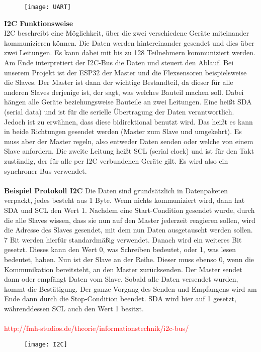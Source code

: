 \documentclass[titlepage,12pt,twoside]{article}
\begin{document}
\begin{figure}[H]
	\begin{center}
		\scalebox{1.0}
		{\texttt{[image: UART]}}
	\end{center}
\end{figure}
\hfill \break
\textbf{I2C Funktionsweise}
\\
I2C beschreibt eine Möglichkeit, über die zwei verschiedene Geräte miteinander 
kommunizieren können. Die Daten werden hintereinander gesendet und dies über zwei 
Leitungen. Es kann dabei mit bis zu 128 Teilnehmern kommuniziert werden. Am Ende 
interpretiert der I2C-Bus die Daten und steuert den Ablauf. Bei unserem Projekt ist 
der ESP32 der Master und die Flexsensoren beispielsweise die Slaves. Der Master ist 
dann der wichtige Bestandteil, da dieser für alle anderen Slaves derjenige ist, der 
sagt, was welches Bauteil machen soll. Dabei hängen alle Geräte beziehungsweise 
Bauteile an zwei Leitungen. Eine heißt SDA (serial data) und ist für die serielle 
Übertragung der Daten verantwortlich. Jedoch ist zu erwähnen, dass diese bidirektional 
benutzt wird. Das heißt es kann in beide Richtungen gesendet werden (Master zum 
Slave und umgekehrt). Es muss aber der Master regeln, also entweder Daten senden 
oder welche von einem Slave anfordern. Die zweite Leitung heißt SCL (serial clock) 
und ist für den Takt zuständig, der für alle per I2C verbundenen Geräte gilt. Es 
wird also ein synchroner Bus verwendet. \\
\\
\textbf{Beispiel Protokoll I2C}
Die Daten sind grundsätzlich in Datenpaketen verpackt, jedes besteht aus 1 Byte. 
Wenn nichts kommuniziert wird, dann hat SDA und SCL den Wert 1. Nachdem eine 
Start-Condition gesendet wurde, durch die alle Slaves wissen, dass sie nun auf den 
Master jederzeit reagieren sollen, wird die Adresse des Slaves gesendet, mit dem 
nun Daten ausgetauscht werden sollen. 7 Bit werden hierfür standardmäßig verwendet. 
Danach wird ein weiteres Bit gesetzt. Dieses kann den Wert 0, was Schreiben bedeutet, 
oder 1, was lesen bedeutet, haben. Nun ist der Slave an der Reihe. Dieser muss 
ebenso 0, wenn die Kommunikation bereitsteht, an den Master zurücksenden. Der Master 
sendet dann oder empfängt Daten vom Slave. Sobald alle Daten versendet wurden, 
kommt die Bestätigung. Der ganze Vorgang des Senden und Empfangens wird am Ende 
dann durch die Stop-Condition beendet. SDA wird hier auf 1 gesetzt, währenddessen 
SCL auch den Wert 1 besitzt. \\
\\
\textcolor{red}{http://fmh-studios.de/theorie/informationstechnik/i2c-bus/}
\\
\begin{figure}[H]
	\begin{center}
		\scalebox{1.2}
		{\texttt{[image: I2C]}}
	\end{center}
\end{figure}
\hfill \break
\end{document}
